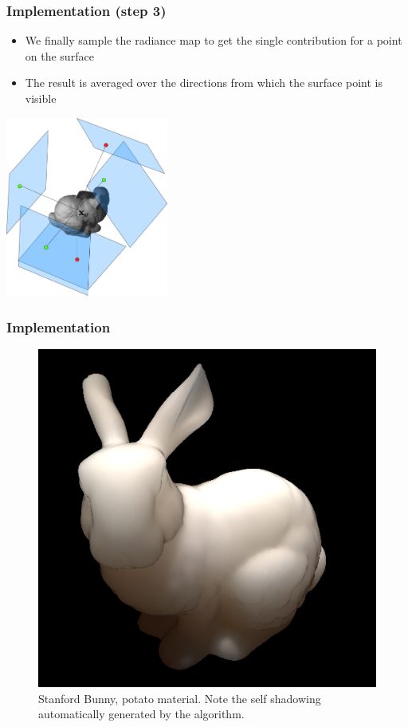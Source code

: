 \documentclass{beamer}
\begin{document}
\begin{frame}
    \frametitle{Implementation (step 3)}
			\begin{itemize}
			\item We finally sample the radiance map to get the single contribution for a point on the surface
			\item The result is averaged over the directions from which the surface point is visible
			\end{itemize}
			\centering
			\vspace{-0.5cm}
			\includegraphics[width=0.4\textwidth]{step3.jpg} 
\end{frame}

\begin{frame}
    \frametitle{Implementation}
\begin{figure}
\vspace{0.3cm}
\centering
\includegraphics[width=0.55 \textwidth]{bunny}
\vspace{-0.3cm}
\caption{Stanford Bunny, potato material. Note the self shadowing automatically generated by the algorithm.}
\end{figure}
\end{frame}
\end{document}
